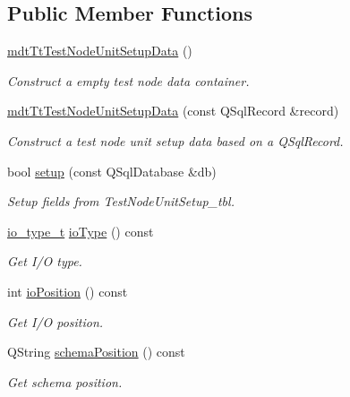 \subsection*{Public Member Functions}
\begin{DoxyCompactItemize}
\item 
\hyperlink{classmdt_tt_test_node_unit_setup_data_a0d9372606909ab76e423f8aa180a9c38}{mdt\-Tt\-Test\-Node\-Unit\-Setup\-Data} ()
\begin{DoxyCompactList}\small\item\em Construct a empty test node data container. \end{DoxyCompactList}\item 
\hyperlink{classmdt_tt_test_node_unit_setup_data_aee5b9ec83805c0ef6fecae14adcee518}{mdt\-Tt\-Test\-Node\-Unit\-Setup\-Data} (const Q\-Sql\-Record \&record)
\begin{DoxyCompactList}\small\item\em Construct a test node unit setup data based on a Q\-Sql\-Record. \end{DoxyCompactList}\item 
bool \hyperlink{classmdt_tt_test_node_unit_setup_data_a2a2bb93f0ceb79adec8b4692cf1afb39}{setup} (const Q\-Sql\-Database \&db)
\begin{DoxyCompactList}\small\item\em Setup fields from Test\-Node\-Unit\-Setup\-\_\-tbl. \end{DoxyCompactList}\item 
\hyperlink{classmdt_tt_test_node_unit_setup_data_a4e69dcc72bebc34d6db64cff91dbfc54}{io\-\_\-type\-\_\-t} \hyperlink{classmdt_tt_test_node_unit_setup_data_a9fd9a35361e52d466ef6e62d29383aa4}{io\-Type} () const 
\begin{DoxyCompactList}\small\item\em Get I/\-O type. \end{DoxyCompactList}\item 
int \hyperlink{classmdt_tt_test_node_unit_setup_data_a24b6ba073f10005678ada247d2b23791}{io\-Position} () const 
\begin{DoxyCompactList}\small\item\em Get I/\-O position. \end{DoxyCompactList}\item 
Q\-String \hyperlink{classmdt_tt_test_node_unit_setup_data_a6ef0406acc3ef7b0b2ee8f168d2a3c76}{schema\-Position} () const 
\begin{DoxyCompactList}\small\item\em Get schema position. \end{DoxyCompactList}\end{DoxyCompactItemize}
